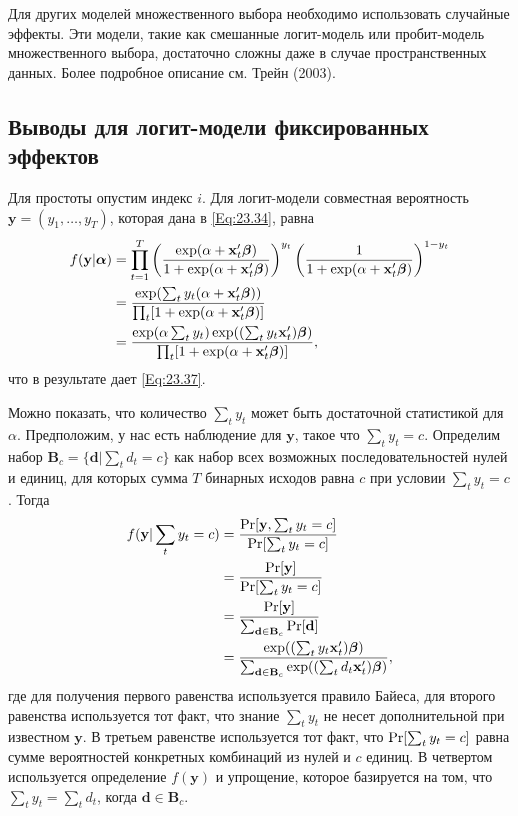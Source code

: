 Для других моделей множественного выбора необходимо использовать случайные эффекты. Эти модели, такие как смешанные логит-модель или пробит-модель множественного выбора, достаточно сложны даже в случае пространственных данных. Более подробное описание см. Трейн (2003).

\subsection{Выводы для логит-модели фиксированных эффектов}

Для простоты опустим индекс $i$. Для логит-модели совместная вероятность  $\mathbf{y}=(y_1, \dots, y_T)$, которая дана в \ref{Eq:23.34}, равна
\begin{align}
f(\mathbf{y}|\bm\alpha)
& =\prod^T_{t=1} \left( \frac{\exp (\alpha+\x'_t \be)}{1+\exp (\alpha+\x'_t\be)} \right) ^{y_t} 
\left( \frac{1}{1+\exp (\alpha+\x'_t\be)}\right)^{1-y_t} 
\label{Eq:23.42}\\
& = \frac{\exp (\sum_t y_t(\alpha+\x'_t \be))}{\prod_t [1+\exp (\alpha+\x'_t \be)]} \nonumber \\
& = \frac{\exp (\alpha \sum_t y_t ) \exp ((\sum_t y_t \x'_t)\be)}{\prod_t [1+\exp (\alpha+\x'_t \be)]}, \nonumber
\end{align}
что в результате дает \ref{Eq:23.37}.

Можно показать, что количество $\sum_t y_t$ может быть достаточной статистикой для $\alpha$. Предположим, у нас есть наблюдение для $\mathbf{y}$, такое что $\sum_t y_t = c$. Определим набор $\mathbf{B}_c = \{ \mathbf{d}| \sum_t d_t = c\}$ как набор всех возможных последовательностей нулей и единиц, для которых сумма $T$ бинарных исходов  равна $c$ при условии $\sum_t y_t = c$. Тогда
\begin{align}
f(\mathbf{y}|\sum_t y_t = c)
& = \frac{\P [\mathbf{y}, \sum_t y_t = c]}{\P [\sum_t y_t = c]}
\label{Eq:23.43} \\
& = \frac{\P [\mathbf{y}]}{\P [\sum_t y_t = c]} \nonumber \\
& = \frac{\P [\mathbf{y}]}{\sum_{\mathbf{d} \in \mathbf{B}_c} \P [\mathbf{d}]} \nonumber \\
& = \frac{\exp ((\sum_t y_t \x'_t) \be )}{\sum_{\mathbf{d} \in \mathbf{B}_c} \exp ((\sum_t d_t \x'_t) \be ) }  \nonumber ,
\end{align}
где для получения первого равенства используется правило Байеса, для второго равенства используется тот факт, что знание $\sum_t y_t$ не несет дополнительной при известном $\mathbf{y}$. В третьем равенстве используется тот факт, что $\P  [\sum_t y_t =c]$ равна сумме вероятностей конкретных комбинаций из нулей и $c$ единиц. В четвертом используется определение $f(\mathbf{y})$ и упрощение, которое базируется на том, что $\sum_t y_t = \sum_t d_t$, когда $\mathbf{d} \in \mathbf{B}_c$.

